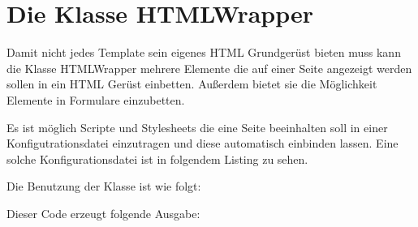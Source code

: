 \section{Die Klasse HTMLWrapper}
\label{sub:Die-Klasse-HTMLWrapper}
Damit nicht jedes Template sein eigenes HTML Grundgerüst bieten muss kann die
Klasse HTMLWrapper mehrere Elemente die auf einer Seite angezeigt werden sollen
in ein HTML Gerüst einbetten. Außerdem bietet sie die Möglichkeit Elemente in
Formulare einzubetten.

Es ist möglich Scripte und Stylesheets die eine Seite
beeinhalten soll in einer Konfigutrationsdatei einzutragen und diese automatisch
einbinden lassen. Eine solche Konfigurationsdatei ist in folgendem Listing zu
sehen.


Die Benutzung der Klasse ist wie folgt:


Dieser Code erzeugt folgende Ausgabe:

